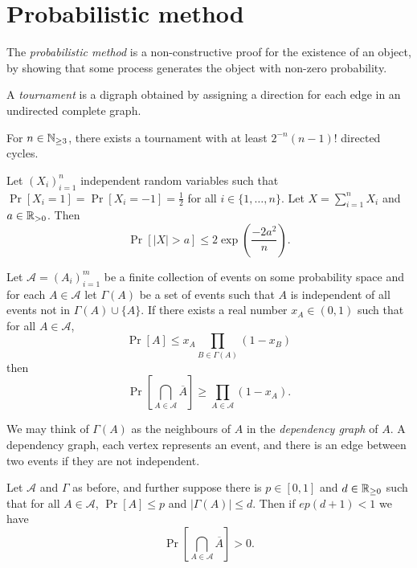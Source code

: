 \section{Probabilistic method}

The \emph{probabilistic method} is a non-constructive proof for the existence of an object, by showing that some process generates the object with non-zero probability.

\begin{definition}[Tournament]
    A \emph{tournament} is a digraph obtained by assigning a direction for each edge in an undirected complete graph. 
\end{definition}

\begin{theorem}
    For $n \in \mathbb N_{\geq 3}$, there exists a tournament with at least $2^{-n}(n-1)!$ directed cycles.
\end{theorem}

\begin{lemma}
    Let $(X_i)_{i=1}^n$ independent random variables such that $\Pr[X_i = 1] = \Pr[X_i = -1] = \frac12$
    for all $i \in \{1, \ldots, n\}$. Let $X = \sum_{i=1}^n X_i$ and $a \in \mathbb R_{>0}$. Then
    \[ \Pr[\lvert X \rvert > a] \leq 2\exp\left(\frac{-2a^2}{n}\right). \]
\end{lemma}

\begin{lemma}
    Let $\mathcal A = (A_i)_{i=1}^m$ be a finite collection of events on some probability space and for each $A \in \mathcal A$ let $\Gamma(A)$ be a set of events such that $A$ is independent of all events not in $\Gamma(A) \cup \{A\}$. If there exists a real number $x_A \in (0,1)$ such that for all $A \in \mathcal A$,
    \[ \Pr[A] \leq x_A \prod_{B \in \Gamma(A)} (1 - x_B) \]
    then
    \[ \Pr\left[\bigcap_{A \in \mathcal A} \overline A\right] \geq \prod_{A \in \mathcal A} (1 - x_A). \]
\end{lemma}

\begin{remark}
    We may think of $\Gamma(A)$ as the neighbours of $A$ in the \emph{dependency graph} of $A$. A dependency graph, each vertex represents an event, and there is an edge between two events if they are not independent. 
\end{remark}

\begin{corollary}
    Let $\mathcal A$ and $\Gamma$ as before, and further suppose there is $p \in [0,1]$ and $d \in \mathbb R_{\geq 0}$ such that for all $A \in \mathcal A$, $\Pr[A] \leq p$ and $\lvert \Gamma(A) \rvert \leq d$. Then if $ep(d+1) < 1$ we have
    \[ \Pr\left[\bigcap_{A \in \mathcal A} \overline A\right] > 0. \]
\end{corollary}